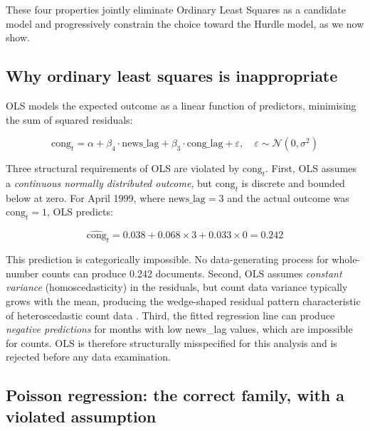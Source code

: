 \documentclass[11pt]{article}
\begin{document}
These four properties jointly eliminate Ordinary Least Squares as a
candidate model and progressively constrain the choice toward the Hurdle
model, as we now show.
 
\subsection{Why ordinary least squares is inappropriate}
 
OLS models the expected outcome as a linear function of predictors, minimising the sum of squared residuals:
 
\begin{equation}
  \text{cong}_{t}
    = \alpha + \beta_4 \cdot \text{news\_lag}
             + \beta_3 \cdot \text{cong\_lag}
             + \varepsilon, \quad
  \varepsilon \sim \mathcal{N}(0, \sigma^2)
  \label{eq:ols}
\end{equation}
 
Three structural requirements of OLS are violated by $\text{cong}_{t}$.
First, OLS assumes a \textit{continuous normally distributed outcome},
but $\text{cong}_{t}$ is discrete and bounded below at zero. For April
1999, where $\text{news\_lag} = 3$ and the actual outcome was
$\text{cong}_{t} = 1$, OLS predicts:
 
\begin{equation*}
  \widehat{\text{cong}}_{t}
    = 0.038 + 0.068 \times 3 + 0.033 \times 0 = 0.242
\end{equation*}
 
This prediction is categorically impossible. No data-generating process
for whole-number counts can produce 0.242 documents. Second, OLS assumes
\textit{constant variance} (homoscedasticity) in the residuals, but
count data variance typically grows with the mean, producing the
wedge-shaped residual pattern characteristic of heteroscedastic count
data \citep{Cameron1998}. Third, the fitted regression line can produce
\textit{negative predictions} for months with low news_lag values, which
are impossible for counts. OLS is therefore structurally misspecified
for this analysis and is rejected before any data examination.
 
\subsection{Poisson regression: the correct family, with a violated
            assumption}
 
\end{document}
